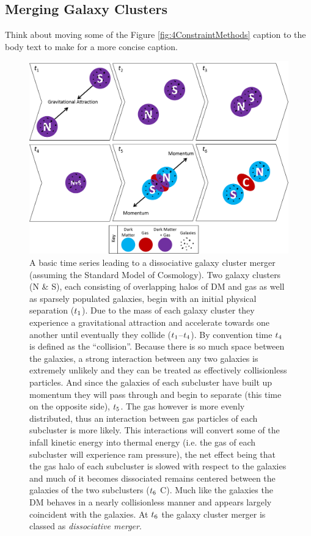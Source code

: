 \subsection{Merging Galaxy Clusters}\label{Section:MergingClusters}

Think about moving some of the Figure \ref{fig:4ConstraintMethods} caption to the body text to make for a more concise caption.

\begin{figure}
\centering
\includegraphics[width=6in]{Chapter1/MergerTimeSeries.png}
\caption{A basic time series leading to a dissociative galaxy cluster merger (assuming the Standard Model of Cosmology).
Two galaxy clusters (N \& S), each consisting of overlapping halos of DM and gas as well as sparsely populated galaxies, begin with an initial physical separation ($t_{\rm 1}$).
Due to the mass of each galaxy cluster they experience a gravitational attraction and accelerate towards one another until eventually they collide ($t_{\rm 1}$--$t_{\rm 4}$).
By convention time $t_{\rm 4}$ is defined as the ``collision''.
Because there is so much space between the galaxies, a strong interaction between any two galaxies is extremely unlikely and they can be treated as effectively collisionless particles.
And since the galaxies of each subcluster have built up momentum they will pass through and begin to separate (this time on the opposite side), $t_{\rm 5}$.
The gas however is more evenly distributed, thus an interaction between gas particles of each subcluster is more likely.
This interactions will convert some of the infall kinetic energy into thermal energy (i.e. the gas of each subcluster will experience ram pressure), the net effect being that the gas halo of each subcluster is slowed with respect to the galaxies and much of it becomes dissociated remains centered between the galaxies of the two subclusters ($t_{\rm 6}$ C).
Much like the galaxies the DM behaves in a nearly collisionless manner and appears largely coincident with the galaxies.
At $t_{\rm 6}$ the galaxy cluster merger is classed as \emph{dissociative merger}.
\label{fig:MergerTimeSeries}}
\end{figure}  

